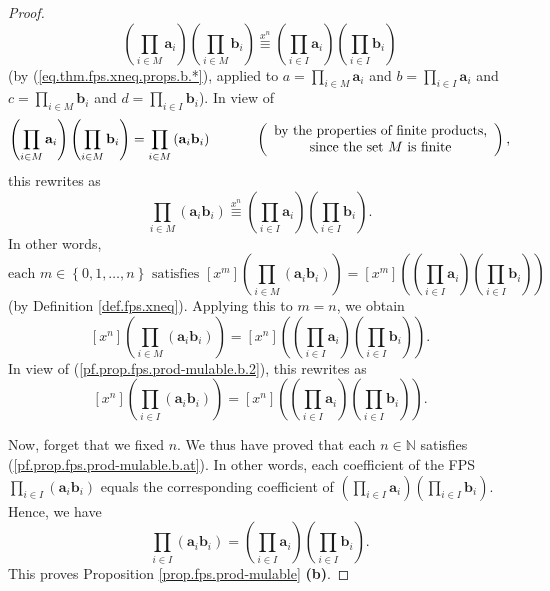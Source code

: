 \begin{fineprint}
\begin{proof}
\[
\left(  \prod_{i\in M}\mathbf{a}_{i}\right)  \left(  \prod_{i\in M}%
\mathbf{b}_{i}\right)  \overset{x^{n}}{\equiv}\left(  \prod_{i\in I}%
\mathbf{a}_{i}\right)  \left(  \prod_{i\in I}\mathbf{b}_{i}\right)
\]
(by (\ref{eq.thm.fps.xneq.props.b.*}), applied to $a=\prod_{i\in M}%
\mathbf{a}_{i}$ and $b=\prod_{i\in I}\mathbf{a}_{i}$ and $c=\prod_{i\in
M}\mathbf{b}_{i}$ and $d=\prod_{i\in I}\mathbf{b}_{i}$). In view of
\[
\left(  \prod_{i\in M}\mathbf{a}_{i}\right)  \left(  \prod_{i\in M}%
\mathbf{b}_{i}\right)  =\prod_{i\in M}\left(  \mathbf{a}_{i}\mathbf{b}%
_{i}\right)  \ \ \ \ \ \ \ \ \ \ \left(
\begin{array}
[c]{c}%
\text{by the properties of finite products,}\\
\text{since the set }M\text{ is finite}%
\end{array}
\right)  ,
\]
this rewrites as
\[
\prod_{i\in M}\left(  \mathbf{a}_{i}\mathbf{b}_{i}\right)  \overset{x^{n}%
}{\equiv}\left(  \prod_{i\in I}\mathbf{a}_{i}\right)  \left(  \prod_{i\in
I}\mathbf{b}_{i}\right)  .
\]
In other words,
\[
\text{each }m\in\left\{  0,1,\ldots,n\right\}  \text{ satisfies }\left[
x^{m}\right]  \left(  \prod_{i\in M}\left(  \mathbf{a}_{i}\mathbf{b}%
_{i}\right)  \right)  =\left[  x^{m}\right]  \left(  \left(  \prod_{i\in
I}\mathbf{a}_{i}\right)  \left(  \prod_{i\in I}\mathbf{b}_{i}\right)  \right)
\]
(by Definition \ref{def.fps.xneq}). Applying this to $m=n$, we obtain
\[
\left[  x^{n}\right]  \left(  \prod_{i\in M}\left(  \mathbf{a}_{i}%
\mathbf{b}_{i}\right)  \right)  =\left[  x^{n}\right]  \left(  \left(
\prod_{i\in I}\mathbf{a}_{i}\right)  \left(  \prod_{i\in I}\mathbf{b}%
_{i}\right)  \right)  .
\]
In view of (\ref{pf.prop.fps.prod-mulable.b.2}), this rewrites as%
\begin{equation}
\left[  x^{n}\right]  \left(  \prod_{i\in I}\left(  \mathbf{a}_{i}%
\mathbf{b}_{i}\right)  \right)  =\left[  x^{n}\right]  \left(  \left(
\prod_{i\in I}\mathbf{a}_{i}\right)  \left(  \prod_{i\in I}\mathbf{b}%
_{i}\right)  \right)  . \label{pf.prop.fps.prod-mulable.b.at}%
\end{equation}


Now, forget that we fixed $n$. We thus have proved that each $n\in\mathbb{N}$
satisfies (\ref{pf.prop.fps.prod-mulable.b.at}). In other words, each
coefficient of the FPS $\prod_{i\in I}\left(  \mathbf{a}_{i}\mathbf{b}%
_{i}\right)  $ equals the corresponding coefficient of $\left(  \prod_{i\in
I}\mathbf{a}_{i}\right)  \left(  \prod_{i\in I}\mathbf{b}_{i}\right)  $.
Hence, we have%
\[
\prod_{i\in I}\left(  \mathbf{a}_{i}\mathbf{b}_{i}\right)  =\left(
\prod_{i\in I}\mathbf{a}_{i}\right)  \left(  \prod_{i\in I}\mathbf{b}%
_{i}\right)  .
\]
This proves Proposition \ref{prop.fps.prod-mulable} \textbf{(b)}.
\end{proof}
\end{fineprint}

